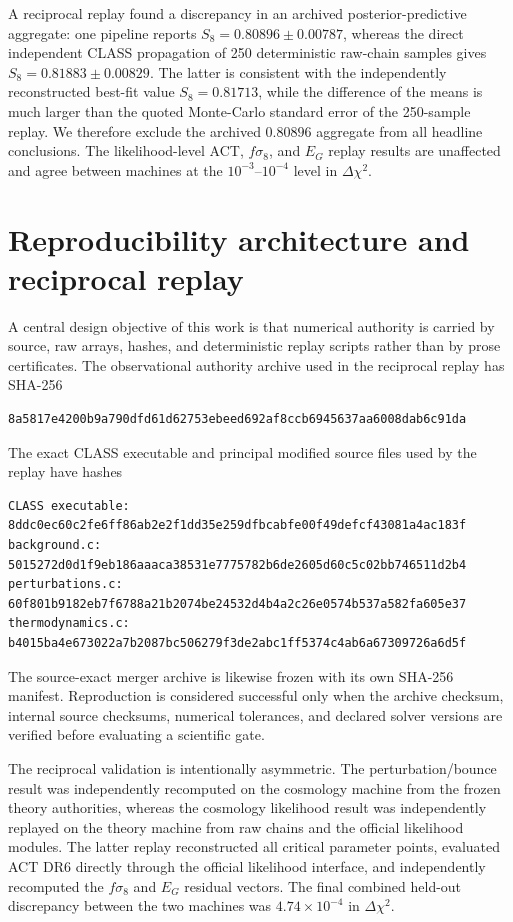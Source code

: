 \documentclass[12pt]{iopart}
\begin{document}
A reciprocal replay found a discrepancy in an archived posterior-predictive aggregate: one pipeline reports $S_8=0.80896\pm0.00787$, whereas the direct independent CLASS propagation of 250 deterministic raw-chain samples gives $S_8=0.81883\pm0.00829$.  The latter is consistent with the independently reconstructed best-fit value $S_8=0.81713$, while the difference of the means is much larger than the quoted Monte-Carlo standard error of the 250-sample replay.  We therefore exclude the archived $0.80896$ aggregate from all headline conclusions.  The likelihood-level ACT, $f\sigma_8$, and $E_G$ replay results are unaffected and agree between machines at the $10^{-3}$--$10^{-4}$ level in $\Delta\chi^2$.

\section{Reproducibility architecture and reciprocal replay}
\label{sec:repro}

A central design objective of this work is that numerical authority is carried by source, raw arrays, hashes, and deterministic replay scripts rather than by prose certificates.  The observational authority archive used in the reciprocal replay has SHA-256
\begin{verbatim}
8a5817e4200b9a790dfd61d62753ebeed692af8ccb6945637aa6008dab6c91da
\end{verbatim}
The exact CLASS executable and principal modified source files used by the replay have hashes
\begin{verbatim}
CLASS executable:
8ddc0ec60c2fe6ff86ab2e2f1dd35e259dfbcabfe00f49defcf43081a4ac183f
background.c:
5015272d0d1f9eb186aaaca38531e7775782b6de2605d60c5c02bb746511d2b4
perturbations.c:
60f801b9182eb7f6788a21b2074be24532d4b4a2c26e0574b537a582fa605e37
thermodynamics.c:
b4015ba4e673022a7b2087bc506279f3de2abc1ff5374c4ab6a67309726a6d5f
\end{verbatim}
The source-exact merger archive is likewise frozen with its own SHA-256 manifest.  Reproduction is considered successful only when the archive checksum, internal source checksums, numerical tolerances, and declared solver versions are verified before evaluating a scientific gate.

The reciprocal validation is intentionally asymmetric.  The perturbation/bounce result was independently recomputed on the cosmology machine from the frozen theory authorities, whereas the cosmology likelihood result was independently replayed on the theory machine from raw chains and the official likelihood modules.  The latter replay reconstructed all critical parameter points, evaluated ACT DR6 directly through the official likelihood interface, and independently recomputed the $f\sigma_8$ and $E_G$ residual vectors.  The final combined held-out discrepancy between the two machines was $4.74\times10^{-4}$ in $\Delta\chi^2$.
\end{document}
